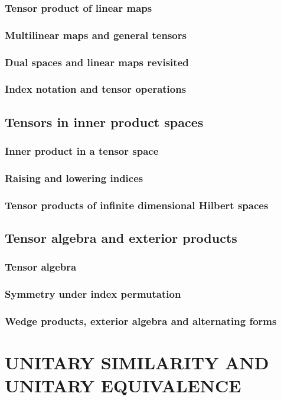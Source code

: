 \documentclass[a4paper,twoside]{article}
\theoremstyle{definition}
\theoremstyle{plain}
\begin{document}
\subsubsection{Tensor product of linear maps}
\subsubsection{Multilinear maps and general tensors}
\subsubsection{Dual spaces and linear maps revisited}
\subsubsection{Index notation and tensor operations}
\subsection{Tensors in inner product spaces}
\subsubsection{Inner product in a tensor space}
\subsubsection{Raising and lowering indices}
\subsubsection{Tensor products of infinite dimensional Hilbert spaces}
\subsection{Tensor algebra and exterior products}
\subsubsection{Tensor algebra}
\subsubsection{Symmetry under index permutation}
\subsubsection{Wedge products, exterior algebra and alternating forms}

\section{UNITARY SIMILARITY AND UNITARY EQUIVALENCE}
\end{document}
